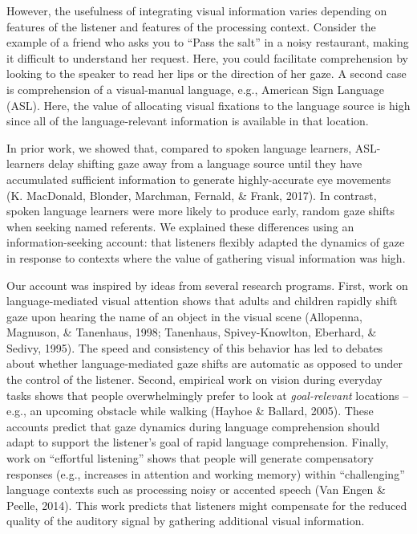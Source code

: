 \documentclass[10pt, letterpaper]{article}
\begin{document}
However, the usefulness of integrating visual information varies
depending on features of the listener and features of the processing
context. Consider the example of a friend who asks you to ``Pass the
salt'' in a noisy restaurant, making it difficult to understand her
request. Here, you could facilitate comprehension by looking to the
speaker to read her lips or the direction of her gaze. A second case is
comprehension of a visual-manual language, e.g., American Sign Language
(ASL). Here, the value of allocating visual fixations to the language
source is high since all of the language-relevant information is
available in that location.

In prior work, we showed that, compared to spoken language learners,
ASL-learners delay shifting gaze away from a language source until they
have accumulated sufficient information to generate highly-accurate eye
movements (K. MacDonald, Blonder, Marchman, Fernald, \& Frank, 2017). In
contrast, spoken language learners were more likely to produce early,
random gaze shifts when seeking named referents. We explained these
differences using an information-seeking account: that listeners
flexibly adapted the dynamics of gaze in response to contexts where the
value of gathering visual information was high.

Our account was inspired by ideas from several research programs. First,
work on language-mediated visual attention shows that adults and
children rapidly shift gaze upon hearing the name of an object in the
visual scene (Allopenna, Magnuson, \& Tanenhaus, 1998; Tanenhaus,
Spivey-Knowlton, Eberhard, \& Sedivy, 1995). The speed and consistency
of this behavior has led to debates about whether language-mediated gaze
shifts are automatic as opposed to under the control of the listener.
Second, empirical work on vision during everyday tasks shows that people
overwhelmingly prefer to look at \emph{goal-relevant} locations -- e.g.,
an upcoming obstacle while walking (Hayhoe \& Ballard, 2005). These
accounts predict that gaze dynamics during language comprehension should
adapt to support the listener's goal of rapid language comprehension.
Finally, work on ``effortful listening'' shows that people will generate
compensatory responses (e.g., increases in attention and working memory)
within ``challenging'' language contexts such as processing noisy or
accented speech (Van Engen \& Peelle, 2014). This work predicts that
listeners might compensate for the reduced quality of the auditory
signal by gathering additional visual information.
\end{document}
